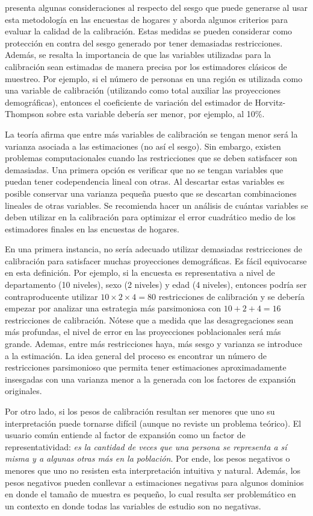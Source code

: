 \documentclass[
  12pt,
  spanish,
]{book}
\begin{document}
\citet{Silva_2004} presenta algunas consideraciones al respecto del sesgo que puede generarse al usar esta metodología en las encuestas de hogares y aborda algunos criterios para evaluar la calidad de la calibración. Estas medidas se pueden considerar como protección en contra del sesgo generado por tener demasiadas restricciones. Además, se resalta la importancia de que las variables utilizadas para la calibración sean estimadas de manera precisa por los estimadores clásicos de muestreo. Por ejemplo, si el número de personas en una región es utilizada como una variable de calibración (utilizando como total auxiliar las proyecciones demográficas), entonces el coeficiente de variación del estimador de Horvitz-Thompson sobre esta variable debería ser menor, por ejemplo, al 10\%.

La teoría afirma que entre más variables de calibración se tengan menor será la varianza asociada a las estimaciones (no así el sesgo). Sin embargo, existen problemas computacionales cuando las restricciones que se deben satisfacer son demasiadas. Una primera opción es verificar que no se tengan variables que puedan tener codependencia lineal con otras. Al descartar estas variables es posible conservar una varianza pequeña puesto que se descartan combinaciones lineales de otras variables. Se recomienda hacer un análisis de cuántas variables se deben utilizar en la calibración para optimizar el error cuadrático medio de los estimadores finales en las encuestas de hogares.

En una primera instancia, no sería adecuado utilizar demasiadas restricciones de calibración para satisfacer muchas proyecciones demográficas. Es fácil equivocarse en esta definición. Por ejemplo, si la encuesta es representativa a nivel de departamento (10 niveles), sexo (2 niveles) y edad (4 niveles), entonces podría ser contraproducente utilizar \(10 \times 2 \times 4 = 80\) restricciones de calibración y se debería empezar por analizar una estrategia más parsimoniosa con \(10 + 2 + 4 = 16\) restricciones de calibración. Nótese que a medida que las desagregaciones sean más profundas, el nivel de error en las proyecciones poblacionales será más grande. Ademas, entre más restricciones haya, más sesgo y varianza se introduce a la estimación. La idea general del proceso es encontrar un número de restricciones parsimonioso que permita tener estimaciones aproximadamente insesgadas con una varianza menor a la generada con los factores de expansión originales.

Por otro lado, si los pesos de calibración resultan ser menores que uno su interpretación puede tornarse difícil (aunque no reviste un problema teórico). El usuario común entiende al factor de expansión como un factor de representatividad: \emph{es la cantidad de veces que una persona se representa a sí misma y a algunas otras más en la población}. Por ende, los pesos negativos o menores que uno no resisten esta interpretación intuitiva y natural. Además, los pesos negativos pueden conllevar a estimaciones negativas para algunos dominios en donde el tamaño de muestra es pequeño, lo cual resulta ser problemático en un contexto en donde todas las variables de estudio son no negativas.
\end{document}
